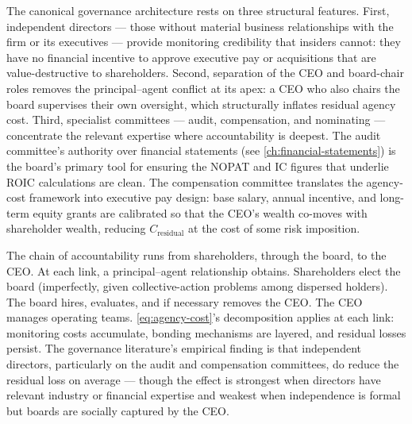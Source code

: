 The canonical governance architecture rests on three structural features. First, independent
directors --- those without material business relationships with the firm or its executives ---
provide monitoring credibility that insiders cannot: they have no financial incentive to approve
executive pay or acquisitions that are value-destructive to shareholders. Second, separation of
the CEO and board-chair roles removes the principal--agent conflict at its apex: a CEO who also
chairs the board supervises their own oversight, which structurally inflates residual agency
cost. Third, specialist committees --- audit, compensation, and nominating --- concentrate the
relevant expertise where accountability is deepest. The audit committee's authority over
financial statements (see \cref{ch:financial-statements}) is the board's primary tool for
ensuring the NOPAT and IC figures that underlie ROIC calculations are clean. The compensation
committee translates the agency-cost framework into executive pay design: base salary, annual
incentive, and long-term equity grants are calibrated so that the CEO's wealth co-moves with
shareholder wealth, reducing \(C_{\text{residual}}\) at the cost of some risk imposition.

The chain of accountability runs from shareholders, through the board, to the CEO. At each link,
a principal--agent relationship obtains. Shareholders elect the board (imperfectly, given
collective-action problems among dispersed holders). The board hires, evaluates, and if necessary
removes the CEO. The CEO manages operating teams. \cref{eq:agency-cost}'s decomposition applies
at each link: monitoring costs accumulate, bonding mechanisms are layered, and residual losses
persist. The governance literature's empirical finding is that independent directors, particularly
on the audit and compensation committees, do reduce the residual loss on average --- though the
effect is strongest when directors have relevant industry or financial expertise and weakest when
independence is formal but boards are socially captured by the CEO.

